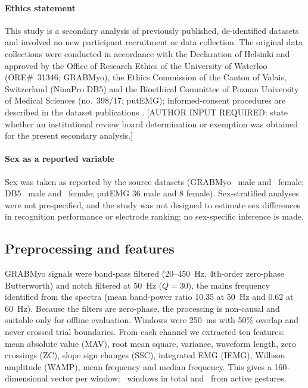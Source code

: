\paragraph{Ethics statement}
This study is a secondary analysis of previously published, de-identified datasets and involved no new participant recruitment or data collection. The original data collections were conducted in accordance with the Declaration of Helsinki and approved by the Office of Research Ethics of the University of Waterloo (ORE\#~31346; GRABMyo), the Ethics Commission of the Canton of Valais, Switzerland (NinaPro DB5) and the Bioethical Committee of Poznan University of Medical Sciences (no.~398/17; putEMG); informed-consent procedures are described in the dataset publications \citep{pradhan2022multiday,pizzolato2017comparison,kaczmarek2019putemg}. [AUTHOR INPUT REQUIRED: state whether an institutional review board determination or exemption was obtained for the present secondary analysis.]

\paragraph{Sex as a reported variable}
Sex was taken as reported by the source datasets (GRABMyo \GRABMyoMale\ male and \GRABMyoFemale\ female; DB5 \DBFiveMale\ male and \DBFiveFemale\ female; putEMG 36 male and 8 female). Sex-stratified analyses were not prespecified, and the study was not designed to estimate sex differences in recognition performance or electrode ranking; no sex-specific inference is made.

\subsection{Preprocessing and features}
\label{sec:preprocessing}
GRABMyo signals were band-pass filtered (20--450~Hz, 4th-order zero-phase Butterworth) and notch filtered at 50~Hz ($Q = 30$), the mains frequency identified from the spectra (mean band-power ratio 10.35 at 50~Hz and 0.62 at 60~Hz). Because the filters are zero-phase, the processing is non-causal and suitable only for offline evaluation. Windows were 250~ms with 50\% overlap and never crossed trial boundaries. From each channel we extracted ten features: mean absolute value (MAV), root mean square, variance, waveform length, zero crossings (ZC), slope sign changes (SSC), integrated EMG (IEMG), Willison amplitude (WAMP), mean frequency and median frequency. This gives a 160-dimensional vector per window: \GRABMyoWindows\ windows in total and \GRABMyoActiveWindows\ from active gestures.

